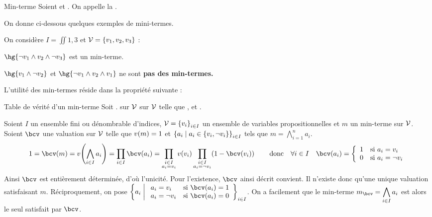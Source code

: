 \documentclass[a4paper,french,bookmarks]{book}
\begin{document}
    \begin{definition}{Min-terme}{}
        Soient  et . On appelle  la .
    \end{definition}
    On donne ci-dessous quelques exemples de mini-termes.
    \begin{example}{}{}
        On considère $I = \iint{1, 3}$ et $\mathcal{V} = \left\{v_1, v_2, v_3\right\}$ :
        \begin{enumerate}
            \itt $\hg{\neg v_1 \land v_2 \land \neg v_3}$ est un min-terme.
            
            \itt $\hg{v_1 \land \neg v_2}$ et $\hg{\neg v_1 \land v_2 \land v_1}$ ne sont \bf{pas} des min-termes.
        \end{enumerate}
    \end{example}
    L'utilité des min-termes réside dans la propriété suivante :
    \begin{property}{Table de vérité d'un min-terme}{}
        Soit .  sur $\mathcal{V}$  sur $\mathcal{V}$ telle que , et .
    \end{property}
    \begin{nproof}
        Soient $I$ un ensemble fini ou dénombrable d'indices, $\mathcal{V} = \left\{v_i\right\}_{i \in I}$ un ensemble de variables propositionnelles et $m$ un min-terme sur $\mathcal{V}$. Soient $\bcv$ une valuation sur $\mathcal{V}$ telle que $v\!\left(m\right) = 1$ et $\left\{a_i \;\middle\vert\; a_i \in \left\{v_i, \neg v_i\right\}\right\}_{i \in I}$ tels que $m = \displaystyle\bigwedge_{i=1}^n a_i$.
        \[ 1 = \bcv\p{m} = v\p{\bigwedge_{i \in I} a_i} = \prod_{i \in I} \bcv\p{a_i} = \prod_{\substack{i \in I\\a_i = v_i}} v\p{v_i} \prod_{\substack{i \in I\\a_i = \neg v_i}} \p{1 - \bcv\p{v_i}} \qquad\text{donc}\quad \forall i \in I\quad \bcv\p{a_i} = \left\lbrace\begin{array}{ll}
            1 &\text{si} \ a_i = v_i  \\
            0 &\text{si} \ a_i = \neg v_i 
        \end{array}\right.\]
        Ainsi $\bcv$ est entièrement déterminée, d'où l'unicité. Pour l'existence, $\bcv$ ainsi décrit convient. Il n'existe donc qu'une unique valuation satisfaisant $m$. Réciproquement, on pose $\ens{a_i \enstq \begin{array}{ll}
            a_i = v_i &\text{si} \ \bcv\p{a_i} = 1  \\
            a_i = \neg v_i &\text{si} \ \bcv\p{a_i} = 0 
        \end{array}}_{i \in I}$. On a facilement que le min-terme $m_\bcv = \displaystyle\bigwedge_{i \in I} a_i$ est alors le seul satisfait par $\bcv$. 
    \end{nproof}
\end{document}

